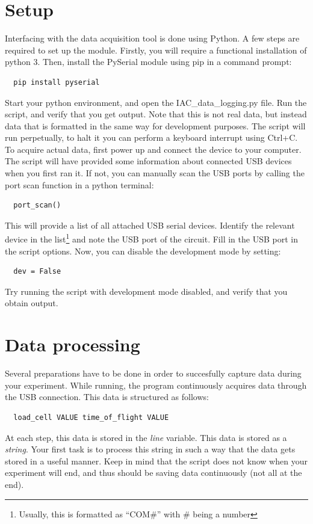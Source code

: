 \documentclass{article}
\begin{document}
 \section{Setup}
 Interfacing with the data acquisition tool is done using Python. A few steps are required to set up the module. Firstly, you will require a functional installation of python 3. Then, install the PySerial module using pip in a command prompt:
 \begin{lstlisting}
  pip install pyserial
 \end{lstlisting}
 Start your python environment, and open the IAC\_data\_logging.py file. Run the script, and verify that you get output. Note that this is not real data, but instead data that is formatted in the same way for development purposes. The script will run perpetually, to halt it you can perform a keyboard interrupt using Ctrl+C. To acquire actual data, first power up and connect the device to your computer. The script will have provided some information about connected USB devices when you first ran it. If not, you can manually scan the USB ports by calling the port scan function in a python terminal:
 \begin{lstlisting}
  port_scan()
 \end{lstlisting}
 This will provide a list of all attached USB serial devices. Identify the relevant device in the list\footnote{Usually, this is formatted as ``COM\#'' with \# being a number} and note the USB port of the circuit. Fill in the USB port in the script options. Now, you can disable the development mode by setting:
 \begin{lstlisting}
  dev = False
 \end{lstlisting}
 Try running the script with development mode disabled, and verify that you obtain output.

 \section{Data processing}
 Several preparations have to be done in order to succesfully capture data during your experiment. While running, the program continuously acquires data through the USB connection. This data is structured as follows:
 \begin{lstlisting}
  load_cell VALUE time_of_flight VALUE
 \end{lstlisting}
 At each step, this data is stored in the \textit{line} variable. This data is stored as a \textit{string}. Your first task is to process this string in such a way that the data gets stored in a useful manner. Keep in mind that the script does not know when your experiment will end, and thus should be saving data continuously (not all at the end).\\
\end{document}
